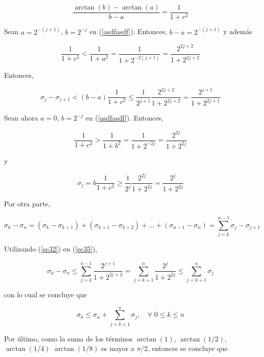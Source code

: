 \begin{equation}\label{asdfasdf}
\frac{\arctan{(b)}-\arctan{(a)}}{b-a}=\frac{1}{1+c^2}
\end{equation}

Sean $a=2^{-(j+1)}$, $b=2^{-j}$ en (\ref{asdfasdf}). Entonces, $b-a=2^{-(j+1)}$ y además

\begin{equation}
\frac{1}{1+c^2}<\frac{1}{1+a^2}=\frac{1}{1+2^{-2(j+1)}}=\frac{2^{2j+2}}{1+2^{2j+2}}
\end{equation}

Entonces,

\begin{equation}\label{ec32}
\sigma_j-\sigma_{j+1}<(b-a)\frac{1}{1+c^2} \le \frac{1}{2^{j+1}}\frac{2^{2j+2}}{1+2^{2j+2}}=\frac{2^{j+1}}{1+2^{2j+1}}
\end{equation}

Sean ahora $a=0$, $b=2^{-j}$ en (\ref{asdfasdf}). Entonces,

\begin{equation}
\frac{1}{1+c^2}>\frac{1}{1+b^2}=\frac{1}{1+2^{-2j}}=\frac{2^{2j}}{1+2^{2j}}
\end{equation}

y

\begin{equation}
\sigma_j=b\frac{1}{1+c^2}\ge\frac{1}{2^j}\frac{2^{2j}}{1+2^{2j}}=\frac{2^j}{1+2^{2j}}
\end{equation}

Por otra parte,

\begin{equation}\label{ec35}
\sigma_k-\sigma_n=(\sigma_{k}-\sigma_{k+1})+(\sigma_{k+1}-\sigma_{k+2})+\ldots+(\sigma_{n-1}-\sigma_{n})= \sum_{j=k}^{n-1}{\sigma_j}-\sigma_{j+1}
\end{equation}

Utilizando (\ref{ec32}) en (\ref{ec35}),

\begin{equation}
\sigma_k-\sigma_n \le \sum_{j=k}^{n-1}{\frac{2^{j+1}}{1+2^{2j+2}}}=\sum_{j=k+1}^{n}{\frac{2^j}{1+2^{2j}}}\le\sum_{j=k+1}^{n}{\sigma_j}
\end{equation}

con lo cual se concluye que 

\begin{equation}
\sigma_k \le \sigma_n + \sum_{j=k+1}^{n}{\sigma_j}, \quad \forall \; 0\le k \le n
\end{equation}

Por último, como la suma de los términos $\arctan(1)$, $\arctan(1/2)$, $\arctan(1/4)$ $\arctan(1/8)$ es mayor a $\pi/2$,
entonces se concluye que

